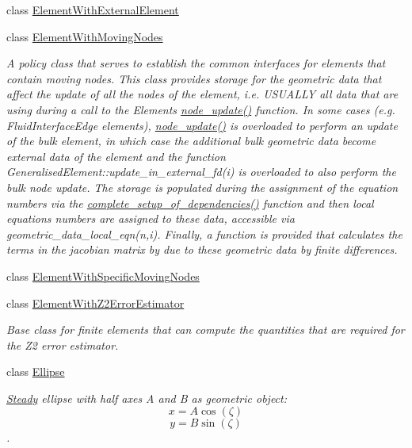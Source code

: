 \begin{DoxyCompactItemize}
class \hyperlink{classoomph_1_1ElementWithExternalElement}{Element\+With\+External\+Element}
\item 
class \hyperlink{classoomph_1_1ElementWithMovingNodes}{Element\+With\+Moving\+Nodes}
\begin{DoxyCompactList}\small\item\em A policy class that serves to establish the common interfaces for elements that contain moving nodes. This class provides storage for the geometric data that affect the update of all the nodes of the element, i.\+e. U\+S\+U\+A\+L\+LY all data that are using during a call to the Element\textquotesingle{}s \hyperlink{classoomph_1_1FiniteElement_ac27d707cb4f7c1429793c0fdb2fd093b}{node\+\_\+update()} function. In some cases (e.\+g. Fluid\+Interface\+Edge elements), \hyperlink{classoomph_1_1FiniteElement_ac27d707cb4f7c1429793c0fdb2fd093b}{node\+\_\+update()} is overloaded to perform an update of the bulk element, in which case the additional bulk geometric data become external data of the element and the function Generalised\+Element\+::update\+\_\+in\+\_\+external\+\_\+fd(i) is overloaded to also perform the bulk node update. The storage is populated during the assignment of the equation numbers via the \hyperlink{classoomph_1_1ElementWithMovingNodes_a6d2fa178f36d4b8413a9ce4f24e9c87e}{complete\+\_\+setup\+\_\+of\+\_\+dependencies()} function and then local equations numbers are assigned to these data, accessible via geometric\+\_\+data\+\_\+local\+\_\+eqn(n,i). Finally, a function is provided that calculates the terms in the jacobian matrix by due to these geometric data by finite differences. \end{DoxyCompactList}\item 
class \hyperlink{classoomph_1_1ElementWithSpecificMovingNodes}{Element\+With\+Specific\+Moving\+Nodes}
\item 
class \hyperlink{classoomph_1_1ElementWithZ2ErrorEstimator}{Element\+With\+Z2\+Error\+Estimator}
\begin{DoxyCompactList}\small\item\em Base class for finite elements that can compute the quantities that are required for the Z2 error estimator. \end{DoxyCompactList}\item 
class \hyperlink{classoomph_1_1Ellipse}{Ellipse}
\begin{DoxyCompactList}\small\item\em \hyperlink{classoomph_1_1Steady}{Steady} ellipse with half axes A and B as geometric object\+: \[ x = A \cos(\zeta) \] \[ y = B \sin(\zeta) \]. \end{DoxyCompactList}\item 

\end{DoxyCompactItemize}
